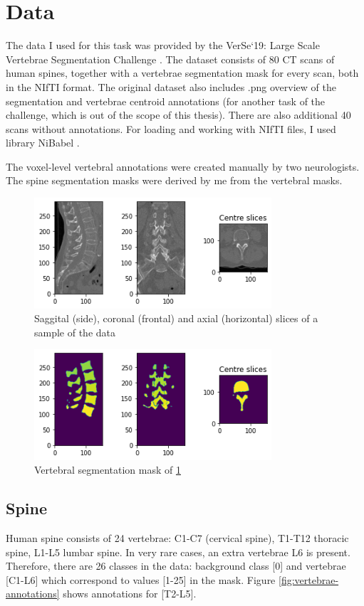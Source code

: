\section{Data}
The data I used for this task was provided by the VerSe`19: Large Scale Vertebrae Segmentation Challenge \cite{verse1, verse2}. The dataset consists of 80 CT scans of human spines, together with a vertebrae segmentation mask for every scan, both in the NIfTI format. The original dataset also includes .png overview of the segmentation and vertebrae centroid annotations (for another task of the challenge, which is out of the scope of this thesis). There are also additional 40 scans without annotations. For loading and working with NIfTI files, I used library NiBabel \cite{nibabel}.

The voxel-level vertebral annotations were created manually by two neurologists. The spine segmentation masks were derived by me from the vertebral masks.

\begin{figure}[ht]
    \centering
    \includegraphics[width=250pt]{images/ct-sample.png}
    \caption[Sample data]{Saggital (side), coronal (frontal) and axial (horizontal) slices of a sample of the data}
    \label{fig:data-sample}
\end{figure}

\begin{figure}[ht]
    \centering
    \includegraphics[width=250pt]{images/mask-sample.png}
    \caption{Vertebral segmentation mask of \ref{fig:data-sample}}
    \label{fig:mask-sample}
\end{figure}

\subsection{Spine}
Human spine consists of 24 vertebrae: C1-C7 (cervical spine), T1-T12 thoracic spine, L1-L5 lumbar spine. In very rare cases, an extra vertebrae L6 is present. Therefore, there are 26 classes in the data: background class [0] and vertebrae [C1-L6] which correspond to values [1-25] in the mask. Figure \ref{fig:vertebrae-annotations} shows annotations for [T2-L5].

